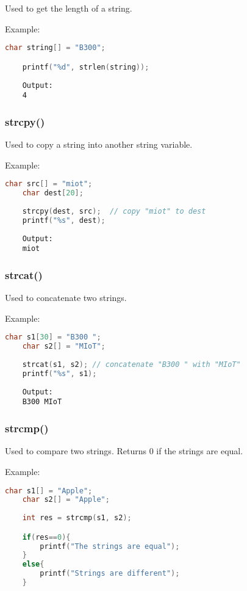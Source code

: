 Used to get the length of a string.

Example:
\begin{lstlisting}[language=c]
	char string[] = "B300";

	printf("%d", strlen(string));
\end{lstlisting}
\begin{verbatim}
	Output:
	4
\end{verbatim}

\subsubsection{strcpy()}

Used to copy a string into another string variable.

Example:
\begin{lstlisting}[language=c]
	char src[] = "miot";
	char dest[20];
	
	strcpy(dest, src);  // copy "miot" to dest
	printf("%s", dest);
\end{lstlisting}
\begin{verbatim}
	Output:
	miot
\end{verbatim}

\subsubsection{strcat()}

Used to concatenate two strings.

Example:
\begin{lstlisting}[language=c]
	char s1[30] = "B300 ";
	char s2[] = "MIoT";
	
	strcat(s1, s2); // concatenate "B300 " with "MIoT"
	printf("%s", s1);
\end{lstlisting}
\begin{verbatim}
	Output:
	B300 MIoT	
\end{verbatim}

\subsubsection{strcmp()}

Used to compare two strings.  
Returns 0 if the strings are equal.

Example:
\begin{lstlisting}[language=c]
	char s1[] = "Apple";
	char s2[] = "Apple";
	
	int res = strcmp(s1, s2);

	if(res==0){
		printf("The strings are equal");
	}
	else{
		printf("Strings are different");
	}
\end{lstlisting}

